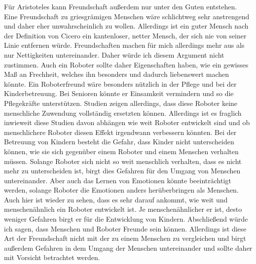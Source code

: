 \documentclass[12pt]{article}
\begin{document}
Für Aristoteles kann Freundschaft außerdem nur unter den Guten entstehen. Eine Freundschaft zu griesgrämigen Menschen wäre schlichtweg sehr anstrengend und daher eher unwahrscheinlich zu wollen. Allerdings ist ein guter Mensch nach der Definition von Cicero ein kantenloser, netter Mensch, der sich nie von seiner Linie entfernen würde. Freundschaften machen für mich allerdings mehr aus als nur Nettigkeiten untereinander. Daher würde ich diesem Argument nicht zustimmen. Auch ein Roboter sollte daher Eigenschaften haben, wie ein gewisses Maß an Frechheit, welches ihn besonders und dadurch liebenswert machen könnte.\newline
Ein Roboterfreund wäre besonders nützlich in der Pflege und bei der Kinderbetreuung. Bei Senioren könnte er Einsamkeit vermindern und so die Pflegekräfte unterstützen. Studien zeigen allerdings, dass diese Roboter keine menschliche Zuwendung vollständig ersetzten können. Allerdings ist es fraglich inwieweit diese Studien davon abhängen wie weit Roboter entwickelt sind und ob menschlichere Roboter diesen Effekt irgendwann verbessern könnten.\newline
Bei der Betreuung von Kindern besteht die Gefahr, dass Kinder nicht unterscheiden können, wie sie sich gegenüber einem Roboter und einem Menschen verhalten müssen. Solange Roboter sich nicht so weit menschlich verhalten, dass es nicht mehr zu unterscheiden ist, birgt dies Gefahren für den Umgang von Menschen untereinander.\newline
Aber auch das Lernen von Emotionen könnte beeinträchtigt werden, solange Roboter die Emotionen anders herüberbringen als Menschen. Auch hier ist wieder zu sehen, dass es sehr darauf ankommt, wie weit und menschenähnlich ein Roboter entwickelt ist. Je menschenähnlicher er ist, desto weniger Gefahren birgt er für die Entwicklung von Kindern.\newline
Abschließend würde ich sagen, dass Menschen und Roboter Freunde sein können. Allerdings ist diese Art der Freundschaft nicht mit der zu einem Menschen zu vergleichen und birgt außerdem Gefahren in dem Umgang der Menschen untereinander und sollte daher mit Vorsicht betrachtet werden.
\end{document}
